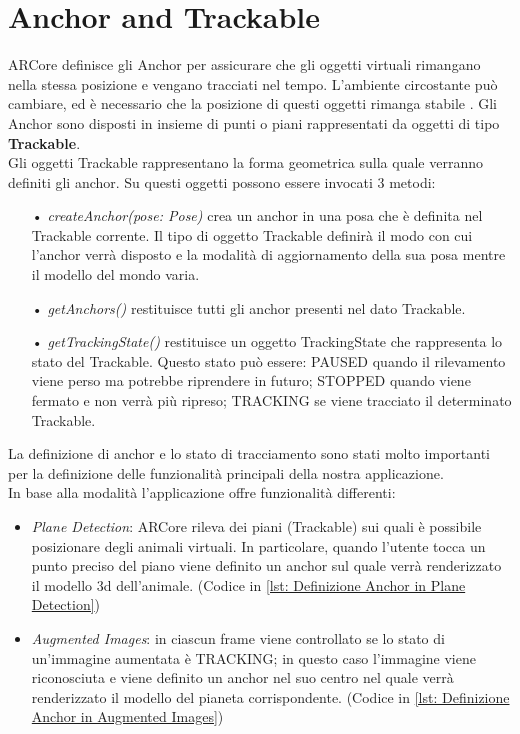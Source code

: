 \documentclass[crop=false, class=book]{standalone}
\begin{document}
		
	\chapter{Anchor and Trackable}
	
		ARCore definisce gli Anchor per assicurare che gli oggetti virtuali rimangano nella stessa posizione e vengano tracciati nel tempo. L'ambiente circostante può cambiare, ed è necessario che la posizione di questi oggetti
		rimanga stabile \cite{gumgumcu2019arcore}. Gli Anchor sono disposti in insieme di punti o piani rappresentati da oggetti di tipo \textbf{Trackable}.\\
		Gli oggetti Trackable rappresentano la forma geometrica sulla quale verranno definiti gli anchor.
		Su questi oggetti possono essere invocati 3 metodi:
		\begin{itemize}
			\item[•] \emph{createAnchor(pose: Pose)} crea un anchor in una posa che è definita nel Trackable corrente. Il tipo di oggetto Trackable definirà il modo con cui l'anchor verrà disposto e la modalità di aggiornamento della sua posa mentre il modello del mondo varia.
			\item[•] \emph{ getAnchors()} restituisce tutti gli anchor presenti nel dato Trackable.
			\item[•] \emph{getTrackingState()} restituisce un oggetto TrackingState che rappresenta lo stato del Trackable. Questo stato può essere: PAUSED quando il rilevamento viene perso ma potrebbe riprendere in futuro; STOPPED quando viene fermato e non verrà più ripreso; TRACKING se viene tracciato il determinato Trackable.
		\end{itemize}
		\begin{flushleft}
			La definizione di anchor e lo stato di tracciamento sono stati molto importanti per la definizione delle funzionalità principali della nostra applicazione.\\
	 		In base alla modalità l'applicazione offre funzionalità differenti:
		\end{flushleft}
	 	\begin{itemize}
	 		\item \emph{Plane Detection}: ARCore rileva dei piani (Trackable) sui quali è possibile posizionare degli animali virtuali. In particolare, quando l'utente tocca un punto preciso del piano viene definito un anchor sul quale verrà renderizzato il modello 3d dell'animale. (Codice in \vref{lst: Definizione Anchor in Plane Detection})
	 	
	 		\item \emph{Augmented Images}: in ciascun frame viene controllato se lo stato di un'immagine aumentata è TRACKING; in questo caso l'immagine viene riconosciuta e viene definito un anchor nel suo centro nel quale verrà renderizzato il modello del pianeta corrispondente. (Codice in \vref{lst: Definizione Anchor in Augmented Images})
	 	\end{itemize}
		
\end{document}
